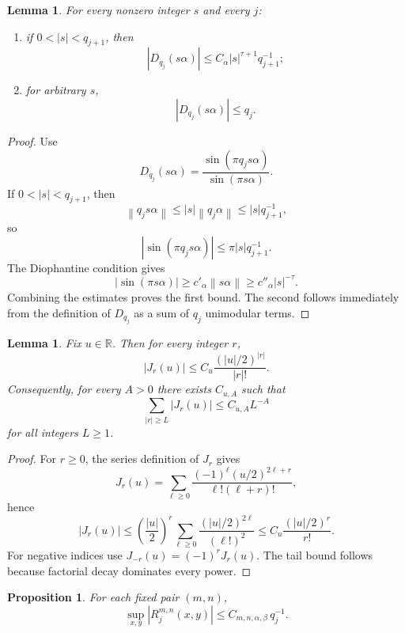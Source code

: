 \documentclass[11pt,reqno]{amsart}
\newtheorem{proposition}[theorem]{Proposition}
\newtheorem{lemma}[theorem]{Lemma}
\theoremstyle{definition}
\newcommand{\R}{\mathbb{R}}
\newcommand{\norm}[1]{\left\lVert #1 \right\rVert}
\newcommand{\abs}[1]{\left\lvert #1 \right\rvert}
\newcommand{\qj}{q_j}
\newcommand{\qjp}{q_{j+1}}
\begin{document}
\begin{lemma}\label{lem:dirichlet}
For every nonzero integer $s$ and every $j$:
\begin{enumerate}[label=\arabic*.]
\item if $0<\abs{s}<\qjp$, then
\[
\abs{D_{\qj}(s\alpha)} \le C_\alpha \abs{s}^{\tau+1}\qjp^{-1};
\]
\item for arbitrary $s$,
\[
\abs{D_{\qj}(s\alpha)} \le \qj.
\]
\end{enumerate}
\end{lemma}

\begin{proof}
Use
\[
D_{\qj}(s\alpha)=\frac{\sin(\pi \qj s\alpha)}{\sin(\pi s\alpha)}.
\]
If $0<\abs{s}<\qjp$, then
\[
\norm{\qj s\alpha}\le \abs{s}\norm{\qj\alpha}\le \abs{s}\qjp^{-1},
\]
so
\[
\abs{\sin(\pi \qj s\alpha)}\le \pi\abs{s}\qjp^{-1}.
\]
The Diophantine condition gives
\[
\abs{\sin(\pi s\alpha)}\ge c'_\alpha \norm{s\alpha}\ge c''_\alpha \abs{s}^{-\tau}.
\]
Combining the estimates proves the first bound. The second follows immediately from the
definition of $D_{\qj}$ as a sum of $\qj$ unimodular terms.
\end{proof}

\begin{lemma}\label{lem:bessel-tail}
Fix $u\in\R$. Then for every integer $r$,
\[
\abs{J_r(u)}\le C_u \frac{(\abs{u}/2)^{\abs{r}}}{\abs{r}!}.
\]
Consequently, for every $A>0$ there exists $C_{u,A}$ such that
\[
\sum_{\abs{r}\ge L} \abs{J_r(u)} \le C_{u,A} L^{-A}
\]
for all integers $L\ge 1$.
\end{lemma}

\begin{proof}
For $r\ge 0$, the series definition of $J_r$ gives
\[
J_r(u)=\sum_{\ell\ge 0} \frac{(-1)^\ell (u/2)^{2\ell+r}}{\ell!(\ell+r)!},
\]
hence
\[
\abs{J_r(u)}
\le
\left(\frac{\abs{u}}{2}\right)^r
\sum_{\ell\ge 0}\frac{(\abs{u}/2)^{2\ell}}{(\ell!)^2}
\le
C_u \frac{(\abs{u}/2)^r}{r!}.
\]
For negative indices use $J_{-r}(u)=(-1)^r J_r(u)$. The tail bound follows because factorial
decay dominates every power.
\end{proof}

\begin{proposition}\label{prop:remainder-one-mode}
For each fixed pair $(m,n)$,
\[
\sup_{x,y}\abs{R_j^{m,n}(x,y)}
\le C_{m,n,\alpha,\beta}\,\qj^{-1}.
\]
\end{proposition}
\end{document}
